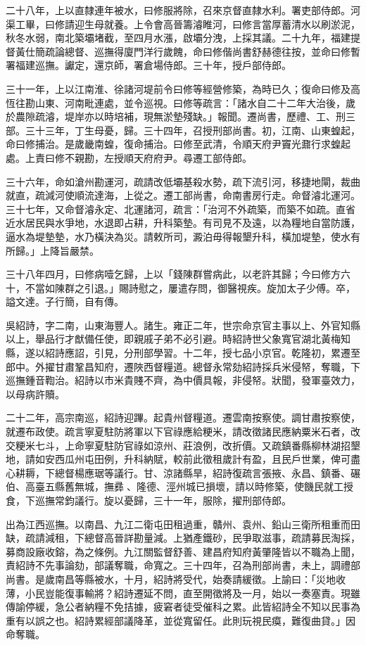 \begin{pinyinscope}
二十八年，上以直隸連年被水，曰修服將除，召來京督直隸水利。署吏部侍郎。河渠工畢，曰修請迎生母就養。上令會高晉籌濬睢河，曰修言當厚蓄清水以刷淤泥，秋冬水弱，南北築壩堵截，至四月水漲，啟壩分洩，上採其議。二十九年，福建提督黃仕簡疏論總督、巡撫得廈門洋行歲餽，命曰修偕尚書舒赫德往按，並命曰修暫署福建巡撫。讞定，還京師，署倉場侍郎。三十年，授戶部侍郎。

三十一年，上以江南淮、徐諸河堤前令曰修等經營修築，為時已久；復命曰修及高恆往勘山東、河南毗連處，並令巡視。曰修等疏言：「諸水自二十二年大治後，歲於農隙疏濬，堤岸亦以時培補，現無淤墊殘缺。」報聞。遷尚書，歷禮、工、刑三部。三十三年，丁生母憂，歸。三十四年，召授刑部尚書。初，江南、山東蝗起，命曰修捕治。是歲畿南蝗，復命捕治。曰修至武清，令順天府尹竇光鼐行求蝗起處。上責曰修不親勘，左授順天府府尹。尋遷工部侍郎。

三十六年，命如滄州勘運河，疏請改低壩基殺水勢，疏下流引河，移捷地閘，裁曲就直，疏減河使順流達海，上從之。遷工部尚書，命南書房行走。命督濬北運河。三十七年，又命督濬永定、北運諸河，疏言：「治河不外疏築，而築不如疏。直省近水居民與水爭地，水退即占耕，升科築墊。有司見不及遠，以為糧地自當防護，逼水為堤墊墊，水乃橫決為災。請敕所司，澱泊毋得報墾升科，橫加堤墊，使水有所歸。」上降旨嚴禁。

三十八年四月，曰修病噎乞歸，上以「錢陳群嘗病此，以老許其歸；今曰修方六十，不當如陳群之引退。」賜詩慰之，屢遣存問，御醫視疾。旋加太子少傅。卒，謚文達。子行簡，自有傳。

吳紹詩，字二南，山東海豐人。諸生。雍正二年，世宗命京官主事以上、外官知縣以上，舉品行才猷備任使，即親戚子弟不必引避。時紹詩世父象寬官湖北黃梅知縣，遂以紹詩應詔，引見，分刑部學習。十二年，授七品小京官。乾隆初，累遷至郎中。外擢甘肅鞏昌知府，遷陜西督糧道。總督永常劾紹詩採兵米侵帑，奪職，下巡撫鍾音鞫治。紹詩以市米貴賤不齊，為中價具報，非侵帑。狀聞，發軍臺效力，以母病許贖。

二十二年，高宗南巡，紹詩迎蹕。起貴州督糧道。遷雲南按察使。調甘肅按察使，就遷布政使。疏言寧夏駐防將軍以下官祿應給粳米，請改徵諸民應納粟米石者，改交粳米七斗，上命寧夏駐防官祿如涼州、莊浪例，改折價。又疏鎮番縣柳林湖招墾地，請如安西瓜州屯田例，升科納賦，較前此徵租歲計有盈，且民戶世業，俾可盡心耕耨，下總督楊應琚等議行。甘、涼諸縣旱，紹詩復疏言張掖、永昌、鎮番、碾伯、高臺五縣舊無城，撫彞、隆德、涇州城已損壞，請以時修築，使饑民就工授食，下巡撫常鈞議行。旋以憂歸，三十一年，服除，擢刑部侍郎。

出為江西巡撫。以南昌、九江二衛屯田租過重，贛州、袁州、鉛山三衛所租重而田缺，疏請減租，下總督高晉詳勘量減。上猶產鐵砂，民爭取滋事，疏請募民淘採，募商設廠收鎔，為之條例。九江關監督舒善、建昌府知府黃肇隆皆以不職為上聞，責紹詩不先事論劾，部議奪職，命寬之。三十四年，召為刑部尚書，未上，調禮部尚書。是歲南昌等縣被水，十月，紹詩將受代，始奏請緩徵。上諭曰：「災地收薄，小民豈能復事輸將？紹詩遷延不問，直至開徵將及一月，始以一奏塞責。現雖傳諭停緩，急公者納糧不免拮據，疲窘者徒受催科之累。此皆紹詩全不知以民事為重有以誤之也。紹詩累經部議降革，並從寬留任。此則玩視民瘼，難復曲貸。」因命奪職。


\end{pinyinscope}
